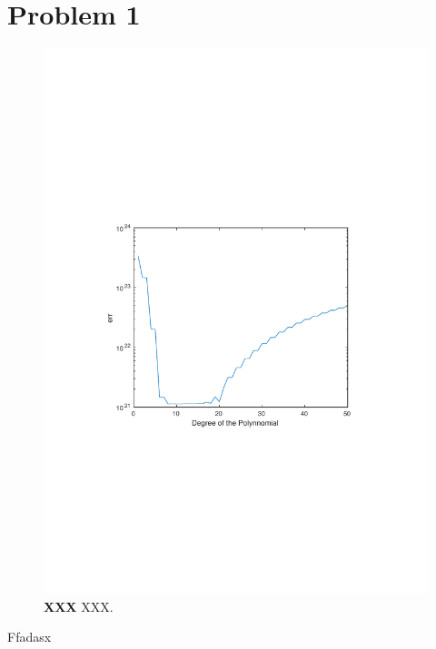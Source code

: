 \section{Problem 1}

\begin{figure}[!h]
{
    \includegraphics[width=\columnwidth]
    {figures/empirical}
    \caption{\footnotesize{\bf XXX} XXX.}
    \label{fig:f}
}
\end{figure}

Ffadasx
